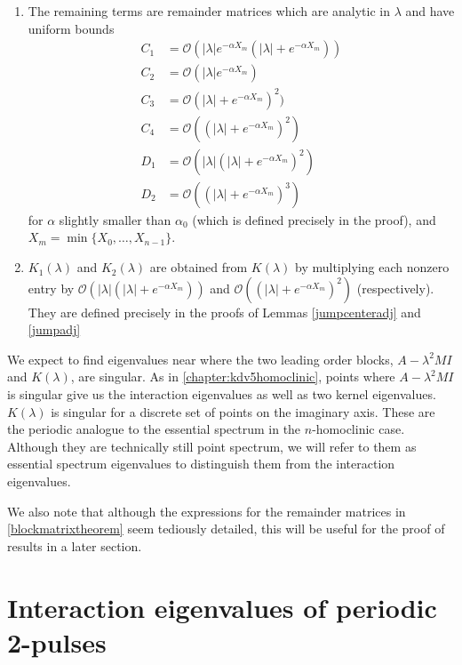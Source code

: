 \documentclass[thesis.tex]{subfiles}
\begin{document}
\begin{theorem}
\begin{enumerate}
\item The remaining terms are remainder matrices which are analytic in $\lambda$ and have uniform bounds
\begin{align*}
C_1 &= \mathcal{O}(|\lambda|e^{-\alpha X_m}(|\lambda| + e^{-\alpha X_m})) \\
C_2 &= \mathcal{O}(|\lambda|e^{-\alpha X_m}) \\
C_3 &= \mathcal{O} (|\lambda| + e^{-\alpha X_m})^2) \\
C_4 &= \mathcal{O}((|\lambda| + e^{-\alpha X_m})^2) \\
D_1 &= \mathcal{O}(|\lambda|(|\lambda| + e^{-\alpha X_m})^2) \\
D_2 &= \mathcal{O}((|\lambda| + e^{-\alpha X_m})^3)
\end{align*}
for $\alpha$ slightly smaller than $\alpha_0$ (which is defined precisely in the proof), and $X_m = \min\{X_0, \dots, X_{n-1}\}$.

\item $K_1(\lambda)$ and $K_2(\lambda)$ are obtained from $K(\lambda)$ by multiplying each nonzero entry by $\mathcal{O}(|\lambda|(|\lambda| + e^{-\alpha X_m}))$ and $\mathcal{O}((|\lambda| + e^{-\alpha X_m})^2)$ (respectively). They are defined precisely in the proofs of Lemmas \ref{jumpcenteradj} and \ref{jumpadj}
\end{enumerate}
\end{theorem}

We expect to find eigenvalues near where the two leading order blocks, $A - \lambda^2 MI$ and $K(\lambda)$, are singular. As in \cref{chapter:kdv5homoclinic}, points where $A - \lambda^2 MI$ is singular give us the interaction eigenvalues as well as two kernel eigenvalues. $K(\lambda)$ is singular for a discrete set of points on the imaginary axis. These are the periodic analogue to the essential spectrum in the $n$-homoclinic case. Although they are technically still point spectrum, we will refer to them as essential spectrum eigenvalues to distinguish them from the interaction eigenvalues.

We also note that although the expressions for the remainder matrices in \cref{blockmatrixtheorem} seem tediously detailed, this will be useful for the proof of results in a later section.

\section{Interaction eigenvalues of periodic 2-pulses}
\end{document}
